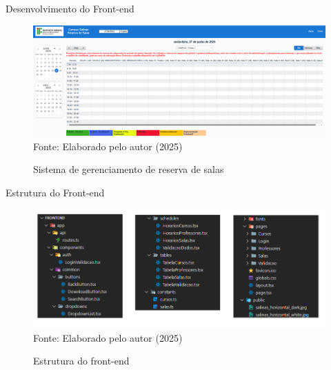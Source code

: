 \begin{frame}{Desenvolvimento do Front-end}
    \begin{figure}
        \centering
        \vspace{-0.5cm}
        \caption{Sistema de gerenciamento de reserva de salas}
        \vspace{-0.2cm}
        \includegraphics[width=1\textwidth]{figuras/front-13.png}
        \\ %
        \small Fonte: Elaborado pelo autor (2025)
    \end{figure}
\end{frame}

\begin{frame}{Estrutura do Front-end}
    \begin{figure}
        \centering
        \vspace{-0.5cm}
        \caption{Estrutura do front-end}
        \vspace{-0.2cm}
        \includegraphics[width=1\textwidth]{figuras/front-14.png}
        \\ %
        \small Fonte: Elaborado pelo autor (2025)
    \end{figure}
\end{frame}

